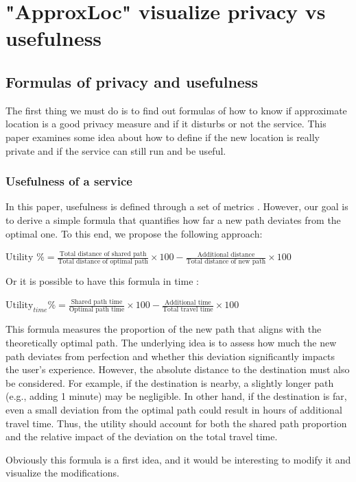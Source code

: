 \documentclass[9pt,conference]{IEEEtran}
\begin{document}
\section{"ApproxLoc" visualize privacy vs usefulness }

\subsection{Formulas of privacy and usefulness}
The first thing we must do is to find out formulas of how to know if approximate location is a good privacy measure and if it disturbs or not the service.
This paper \cite{Haversine} examines some idea about how to define if the new location is really private and if the service can still run and be useful.
\subsubsection{Usefulness of a service}

In this paper, usefulness is defined through a set of metrics \cite{Haversine}. However, our goal is to derive a simple formula that quantifies how far a new path deviates from the optimal one. To this end, we propose the following approach:

$\text{Utility } \% = \frac{\text{Total distance of shared path}}{\text{Total distance of optimal path}} \times 100 - \frac{\text{Additional distance}}{\text{Total distance of new path}} \times 100$

Or it is possible to have this formula in time :

$\text{Utility}_{time} \% = \frac{\text{Shared path time}}{\text{Optimal path time}} \times 100 - \frac{\text{Additional time}}{\text{Total travel time}} \times 100$


This formula measures the proportion of the new path that aligns with the theoretically optimal path. The underlying idea is to assess how much the new path deviates from perfection and whether this deviation significantly impacts the user’s experience.
However, the absolute distance to the destination must also be considered. For example, if the destination is nearby, a slightly longer path (e.g., adding 1 minute) may be negligible. In other hand, if the destination is far, even a small deviation from the optimal path could result in hours of additional travel time. Thus, the utility should account for both the shared path proportion and the relative impact of the deviation on the total travel time.

Obviously this formula is a first idea, and it would be interesting to modify it and visualize the modifications.
\end{document}
